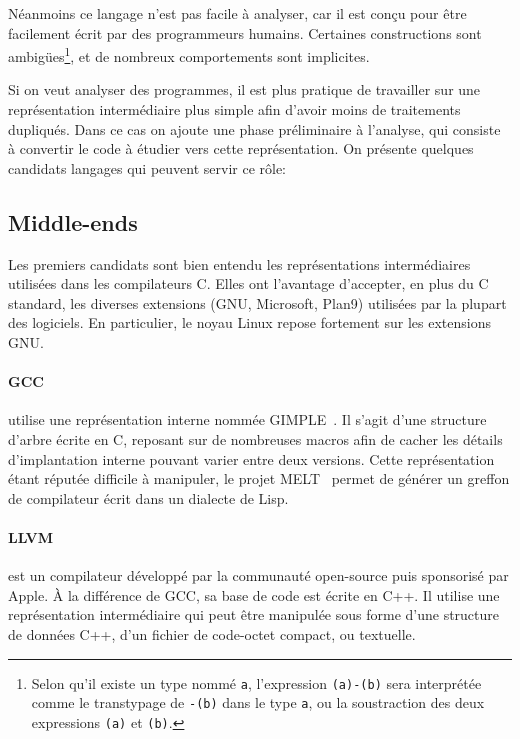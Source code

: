 Néanmoins ce langage n'est pas facile à analyser, car il est conçu pour être
facilement écrit par des programmeurs humains. Certaines constructions sont
ambigües\footnote{
    Selon qu'il existe un type nommé \texttt{a}, l'expression \texttt{(a)-(b)}
    sera interprétée comme le transtypage de \texttt{-(b)} dans le type
    \texttt{a}, ou la soustraction des deux expressions \texttt{(a)} et
    \texttt{(b)}.
}, et de nombreux comportements sont implicites.

Si on veut analyser des programmes, il est plus pratique de travailler sur une
représentation intermédiaire plus simple afin d'avoir moins de traitements
dupliqués. Dans ce cas on ajoute une phase préliminaire à l'analyse, qui
consiste à convertir le code à étudier vers cette représentation. On présente
quelques candidats langages qui peuvent servir ce rôle:

\subsection*{Middle-ends}

Les premiers candidats sont bien entendu les représentations intermédiaires
utilisées dans les compilateurs C. Elles ont l'avantage d'accepter, en plus du C
standard, les diverses extensions (GNU, Microsoft, Plan9) utilisées par la
plupart des logiciels. En particulier, le noyau Linux repose fortement sur les
extensions GNU.\@

\paragraph{GCC} utilise une représentation interne nommée
GIMPLE~\cite{gcc-gimple}. Il s'agit d'une structure d'arbre écrite en C,
reposant sur de nombreuses macros afin de cacher les détails d'implantation
interne pouvant varier entre deux versions. Cette représentation étant réputée
difficile à manipuler, le projet MELT~\cite{gcc-melt} permet de générer un
greffon de compilateur écrit dans un dialecte de Lisp.

\paragraph{LLVM}\cite{llvm-pres} est un compilateur développé par la communauté
open-source puis sponsorisé par Apple. À la différence de GCC, sa base de code
est écrite en C++. Il utilise une représentation intermédiaire qui peut être
manipulée sous forme d'une structure de données C++, d'un fichier de code-octet
compact, ou textuelle.


